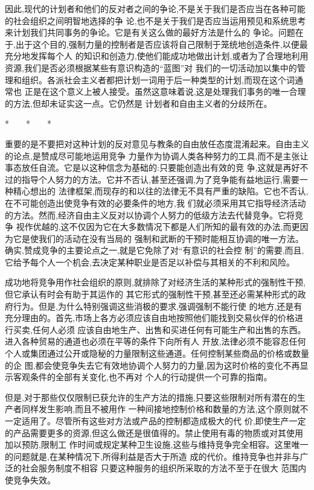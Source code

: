 ﻿\documentclass[12pt]{article}
\begin{document}
因此,现代的计划者和他们的反对者之间的争论,不是关于我们是否应当在各种可能的社会组织之间明智地选择的争
论,也不是关于我们是否应当运用预见和系统思考来计划我们共同事务的争论。它是有关这么做的最好方法是什么的
争论。问题在于,出于这个目的,强制力量的控制者是否应该将自己限制于笼统地创造条件,以便最充分地发挥每个人
的知识和创造力,使他们能成功地做出计划,或者为了合理地利用资源,我们是否必须根据某些有意识构造的``蓝图''对
我们的一切活动加以集中的管理和组织。各派社会主义者都把计划一词用于后一种类型的计划,而现在这个词通常也
正是在这个意义上被人接受。虽然这意味着说,这是处理我们事务的唯一合理的方法,但却未证实这一点。它仍然是
计划者和自由主义者的分歧所在。

*　　*　　*

重要的是不要把对这种计划的反对意见与教条的自由放任态度混淆起来。自由主义的论点,是赞成尽可能地运用竞争
力量作为协调人类各种努力的工具,而不是主张让事态放任自流。它是以这种信念为基础的:只要能创造出有效的竞
争,这就是再好不过的指导个人努力的方法。它并不否认,甚至还强调,为了竞争能有益地运行,需要一种精心想出的
法律框架,而现存的和以往的法律无不具有严重的缺陷。它也不否认,在不可能创造出使竞争有效的必要条件的地方,我
们就必须采用其它指导经济活动的方法。然而,经济自由主义反对以协调个人努力的低级方法去代替竞争。它将竞争
视作优越的,这不仅因为它在大多数情况下都是人们所知的最有效的办法,而更因为它是使我们的活动在没有当局的
强制和武断的干预时能相互协调的唯一方法。确实,赞成竞争的主要论点之一,就是它免除了对``有意识的社会控
制''的需要,而且,它给予每个人一个机会,去决定某种职业是否足以补偿与其相关的不利和风险。

成功地将竞争用作社会组织的原则,就排除了对经济生活的某种形式的强制性干预,但它承认有时会有助于其运作的
其它形式的强制性干预,甚至还必需某种形式的政府行为。但是,为什么特别强调这些消极的要求,强调强制不能行使
的地方,还是有充分理由的。首先,市场上各方必须应该自由地按照他们能找到交易伙伴的价格进行买卖,任何人必须
应该自由地生产、出售和买进任何有可能生产和出售的东西。进入各种贸易的通道也必须在平等的条件下向所有人
开放,法律必须不能容忍任何个人或集团通过公开或隐秘的力量限制这些通道。任何控制某些商品的价格或数量的企
图,都会使竞争失去它有效地协调个人努力的力量,因为这时价格的变化不再显示客观条件的全部有关变化,也不再对
个人的行动提供一个可靠的指南。

但是,对于那些仅仅限制已获允许的生产方法的措施,只要这些限制对所有潜在的生产者同样发生影响,而且不被用作
一种间接地控制价格和数量的方法,这个原则就不一定适用了。尽管所有这些对方法或产品的控制都造成极大的代
价,即使生产一定的产品需要更多的资源,但这么做还是很值得的。禁止使用有毒的物质或对其使用加以预防,限制工
作时间或规定某种卫生设施,这些与维持竞争完全相容。这里唯一的问题就是,在某种情况下,所得利益是否大于所造
成的代价。维持竞争也并非与广泛的社会服务制度不相容 \myrule 只要这种服务的组织所采取的方法不至于在很大
范围内使竞争失效。
\end{document}
